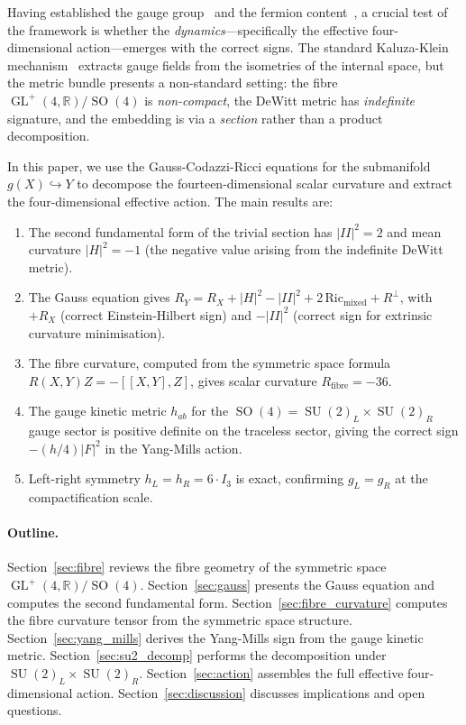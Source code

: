 \documentclass[12pt,a4paper]{article}
\theoremstyle{definition}
\newcommand{\GL}{\operatorname{GL}}
\newcommand{\SO}{\operatorname{SO}}
\newcommand{\SU}{\operatorname{SU}}
\newcommand{\R}{\mathbb{R}}
\begin{document}
Having established the gauge group~\cite{Paper1} and the fermion content~\cite{Paper2}, a crucial test of the framework is whether the \emph{dynamics}---specifically the effective four-dimensional action---emerges with the correct signs.
The standard Kaluza-Klein mechanism~\cite{KaluzaKlein,Bailin1987} extracts gauge fields from the isometries of the internal space, but the metric bundle presents a non-standard setting: the fibre $\GL^+(4,\R)/\SO(4)$ is \emph{non-compact}, the DeWitt metric has \emph{indefinite} signature, and the embedding is via a \emph{section} rather than a product decomposition.

In this paper, we use the Gauss-Codazzi-Ricci equations for the submanifold $g(X) \hookrightarrow Y$ to decompose the fourteen-dimensional scalar curvature and extract the four-dimensional effective action.
The main results are:

\begin{enumerate}[nosep]
\item The second fundamental form of the trivial section has $|II|^2 = 2$ and mean curvature $|H|^2 = -1$ (the negative value arising from the indefinite DeWitt metric).
\item The Gauss equation gives $R_Y = R_X + |H|^2 - |II|^2 + 2\,\mathrm{Ric}_{\mathrm{mixed}} + R^\perp$, with $+R_X$ (correct Einstein-Hilbert sign) and $-|II|^2$ (correct sign for extrinsic curvature minimisation).
\item The fibre curvature, computed from the symmetric space formula $R(X,Y)Z = -[[X,Y],Z]$, gives scalar curvature $R_{\mathrm{fibre}} = -36$.
\item The gauge kinetic metric $h_{ab}$ for the $\SO(4) = \SU(2)_L \times \SU(2)_R$ gauge sector is positive definite on the traceless sector, giving the correct sign $-(h/4)|F|^2$ in the Yang-Mills action.
\item Left-right symmetry $h_L = h_R = 6\cdot I_3$ is exact, confirming $g_L = g_R$ at the compactification scale.
\end{enumerate}

\paragraph{Outline.}
Section~\ref{sec:fibre} reviews the fibre geometry of the symmetric space $\GL^+(4,\R)/\SO(4)$.
Section~\ref{sec:gauss} presents the Gauss equation and computes the second fundamental form.
Section~\ref{sec:fibre_curvature} computes the fibre curvature tensor from the symmetric space structure.
Section~\ref{sec:yang_mills} derives the Yang-Mills sign from the gauge kinetic metric.
Section~\ref{sec:su2_decomp} performs the decomposition under $\SU(2)_L \times \SU(2)_R$.
Section~\ref{sec:action} assembles the full effective four-dimensional action.
Section~\ref{sec:discussion} discusses implications and open questions.
\end{document}
